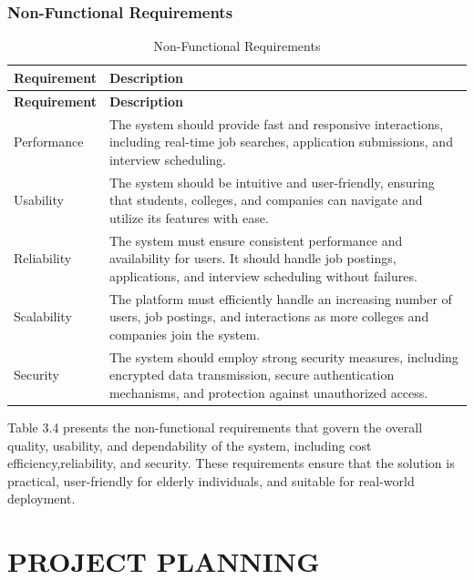 \documentclass[a4paper, 12pt]{report}
\begin{document}
\subsection{Non-Functional Requirements}
\begin{longtable}{|p{}|p{}|}
    \caption{Non-Functional Requirements}\label{tab:non_functional_requirements} \\
    
    \hline
    \textbf{Requirement} & \textbf{Description} \\
    \hline
    \endfirsthead

    \hline
    \textbf{Requirement} & \textbf{Description} \\
    \hline
    \endhead

    \hline
    \endfoot

    \hline
    \endlastfoot

    Performance & The system should provide fast and responsive interactions, including real-time job searches, application submissions, and interview scheduling. \\
    \hline
    Usability & The system should be intuitive and user-friendly, ensuring that students, colleges, and companies can navigate and utilize its features with ease. \\
    \hline
    Reliability &The system must ensure consistent performance and availability for users. It should handle job postings, applications, and interview scheduling without failures. \\
    \hline
    Scalability &The platform must efficiently handle an increasing number of users, job postings, and interactions as more colleges and companies join the system. \\
    \hline
    Security & The system should employ strong security measures, including encrypted data transmission, secure authentication mechanisms, and protection against unauthorized access. \\
\end{longtable}
Table 3.4 presents the non-functional requirements that govern the overall quality, usability, and dependability of the system, including cost efficiency,reliability, and security. These requirements ensure that the solution is practical, user-friendly for elderly individuals, and suitable for real-world deployment. 

\chapter{PROJECT PLANNING}
\end{document}

